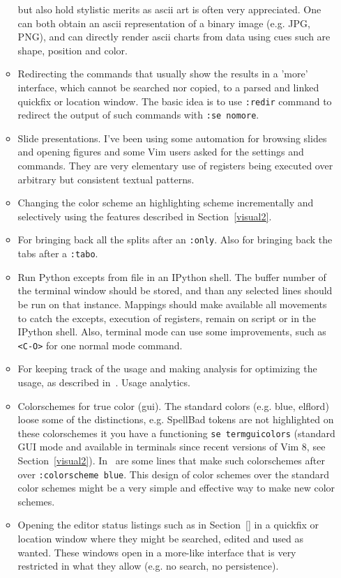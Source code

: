 \documentclass{article}
\newcommand{\ttt}[1] {
	\texttt{<#1>}}
\newcommand{\tttt}[1]{\texttt{#1}}
\begin{document}
\begin{itemize}
\begin{itemize}
        but also hold stylistic merits as ascii art is often
        very appreciated.
        One can both obtain an ascii representation of a binary image (e.g. JPG, PNG),
        and can directly render ascii charts from data using cues such are shape, position
        and color.
      \item Redirecting the commands that usually show the results in a 'more' interface,
        which cannot be searched nor copied,
        to a parsed and linked quickfix or location window.
        The basic idea is to use \tttt{:redir} command to redirect the output
        of such commands with \tttt{:se nomore}.
      \item Slide presentations. I've been using some automation for browsing
        slides and opening figures and some Vim users asked for the settings and
        commands. They are very elementary use of registers being executed over
        arbitrary but consistent textual patterns.
      \item Changing the color scheme an highlighting scheme incrementally
        and selectively using the features described in Section~\ref{visual2}.
      \item For bringing back all the splits after an \tttt{:only}.
        Also for bringing back the tabs after a \tttt{:tabo}.
      \item Run Python excepts from file in an IPython shell. 
        The buffer number of the terminal window should be stored,
        and than any selected lines should be run on that instance.
        Mappings should make available all movements to catch the excepts,
        execution of registers, remain on script or in the IPython shell.
        Also, terminal mode can use some improvements, such as \ttt{C-O} for
        one normal mode command.
      \item For keeping track of the usage and making analysis
        for optimizing the usage, as described in~\cite{http://www.drbunsen.org/vim-croquet/}. Usage analytics.
      \item Colorschemes for true color (gui).
        The standard colors (e.g. blue, elflord) loose some of the distinctions,
        e.g. SpellBad tokens are not highlighted on these colorschemes
        it you have a functioning \tttt{se termguicolors} (standard GUI mode
        and available in terminals since recent versions of Vim 8, see Section~\ref{visual2}). In~\cite{vimrc} are some lines that make such colorschemes after over
        \tttt{:colorscheme blue}.
        This design of color schemes over the standard color schemes might be
        a very simple and effective way to make new color schemes.
      \item Opening the editor status listings such as in Section~\ref{}
        in a quickfix or location window where they might be searched, edited
        and used as wanted.
        These windows open in a more-like interface that is very restricted in what
        they allow (e.g. no search, no persistence).
    \end{itemize}
\end{itemize}
\end{document}
